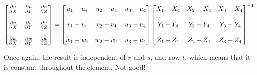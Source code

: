 \begin{eqnarray*}
\begin{bmatrix}
{\partial u \over \partial X} & {\partial u \over \partial Y}  & {\partial u \over \partial Z} \\
\\
{\partial v \over \partial X} & {\partial v \over \partial Y}  & {\partial v \over \partial Z} \\
\\
{\partial w \over \partial X} & {\partial w \over \partial Y}  & {\partial w \over \partial Z} \\
\end{bmatrix}
=
\begin{bmatrix}
u_1 - u_4 & u_2 - u_4 & u_3 - u_4 \\
\\
v_1 - v_4 & v_2 - v_4 & u_3 - u_4 \\
\\
w_1 - w_4 & w_2 - w_4 & u_3 - u_4 \\
\end{bmatrix}
\begin{bmatrix}
X_1 - X_4 & X_2 - X_4 & X_3 - X_4 \\
\\
Y_1 - Y_4 & Y_2 - Y_4 & Y_3 - Y_4 \\
\\
Z_1 - Z_4 & Z_2 - Z_4 & Z_3 - Z_4 \\
\end{bmatrix}^{-1}
\end{eqnarray*}

Once again, the result is independent of $ r $ and $ s $, and now $ t $, which means that it is constant throughout the element. Not good!
